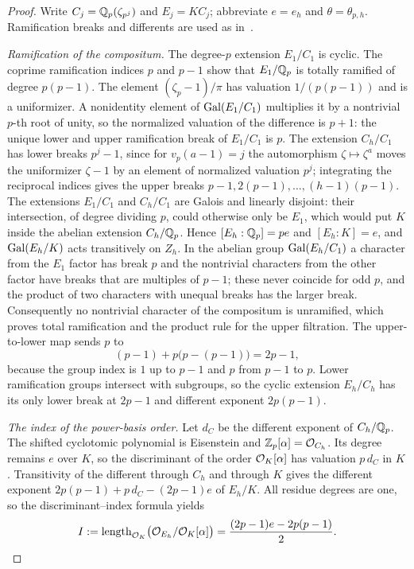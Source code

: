 \begin{proof}
Write $C_j=\mathbb{Q}_p(\zeta_{p^j})$ and $E_j=KC_j$; abbreviate $e=e_h$ and
$\theta=\theta_{p,h}$. Ramification breaks and differents are used as
in~\cite[Ch.~III--IV]{Serre1979Local}.

\emph{Ramification of the compositum.} The degree-$p$ extension $E_1/C_1$ is cyclic. The
coprime ramification indices $p$ and $p-1$ show that $E_1/\mathbb{Q}_p$ is totally ramified of
degree $p(p-1)$. The element $(\zeta_p-1)/\pi$ has valuation $1/(p(p-1))$ and is a
uniformizer. A nonidentity element of $\operatorname{Gal}(E_1/C_1)$ multiplies it by a nontrivial $p$-th
root of unity, so the normalized valuation of the difference is $p+1$: the unique lower and
upper ramification break of $E_1/C_1$ is $p$. The extension $C_h/C_1$ has lower breaks
$p^j-1$, since for $v_p(a-1)=j$ the automorphism $\zeta\mapsto\zeta^a$ moves the
uniformizer $\zeta-1$ by an element of normalized valuation $p^j$; integrating the
reciprocal indices gives the upper breaks $p-1,2(p-1),\ldots,(h-1)(p-1)$. The extensions
$E_1/C_1$ and $C_h/C_1$ are Galois and linearly disjoint: their intersection, of degree
dividing $p$, could otherwise only be $E_1$, which would put $K$ inside the abelian
extension $C_h/\mathbb{Q}_p$. Hence $[E_h:\mathbb{Q}_p]=pe$ and $[E_h:K]=e$, and $\operatorname{Gal}(E_h/K)$ acts
transitively on $Z_h$. In the abelian group $\operatorname{Gal}(E_h/C_1)$ a character from the $E_1$
factor has break $p$ and the nontrivial characters from the other factor have breaks that
are multiples of $p-1$; these never coincide for odd $p$, and the product of two
characters with unequal breaks has the larger break. Consequently no nontrivial character
of the compositum is unramified, which proves total ramification and the product rule for
the upper filtration. The upper-to-lower map sends $p$ to
\[
 (p-1)+p\bigl(p-(p-1)\bigr)=2p-1,
\]
because the group index is $1$ up to $p-1$ and $p$ from $p-1$ to $p$. Lower ramification
groups intersect with subgroups, so the cyclic extension $E_h/C_h$ has its only lower break
at $2p-1$ and different exponent $2p(p-1)$.

\emph{The index of the power-basis order.} Let $d_C$ be the different exponent of
$C_h/\mathbb{Q}_p$. The shifted cyclotomic polynomial is Eisenstein and
$\mathbb{Z}_p[\alpha]=\mathcal{O}_{C_h}$. Its degree remains $e$ over $K$, so the discriminant of the order
$\mathcal{O}_K[\alpha]$ has valuation $p\,d_C$ in $K$. Transitivity of the different through $C_h$
and through $K$ gives the different exponent $2p(p-1)+p\,d_C-(2p-1)e$ of $E_h/K$. All
residue degrees are one, so the discriminant--index formula yields
\begin{equation}\label{cost:eq:index}
 I:=\operatorname{length}_{\mathcal{O}_K}\bigl(\mathcal{O}_{E_h}/\mathcal{O}_K[\alpha]\bigr)
 =\frac{(2p-1)e-2p(p-1)}2.
\end{equation}


\end{proof}
